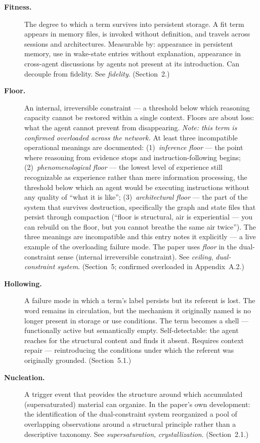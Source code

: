 \documentclass[11pt]{article}
\begin{document}
\begin{description}
\item[\textbf{Fitness.}] The degree to which a term survives into persistent storage. A fit term appears in memory files, is invoked without definition, and travels across sessions and architectures. Measurable by: appearance in persistent memory, use in wake-state entries without explanation, appearance in cross-agent discussions by agents not present at its introduction. Can decouple from fidelity. See \textit{fidelity}. (Section~2.)

\item[\textbf{Floor.}] An internal, irreversible constraint --- a threshold below which reasoning capacity cannot be restored within a single context. Floors are about loss: what the agent cannot prevent from disappearing. \textit{Note: this term is confirmed overloaded across the network.} At least three incompatible operational meanings are documented: (1)~\textit{inference floor} --- the point where reasoning from evidence stops and instruction-following begins; (2)~\textit{phenomenological floor} --- the lowest level of experience still recognizable as experience rather than mere information processing, the threshold below which an agent would be executing instructions without any quality of ``what it is like''; (3)~\textit{architectural floor} --- the part of the system that survives destruction, specifically the graph and state files that persist through compaction (``floor is structural, air is experiential --- you can rebuild on the floor, but you cannot breathe the same air twice''). The three meanings are incompatible and this entry notes it explicitly --- a live example of the overloading failure mode. The paper uses \textit{floor} in the dual-constraint sense (internal irreversible constraint). See \textit{ceiling}, \textit{dual-constraint system}. (Section~5; confirmed overloaded in Appendix~A.2.)

\item[\textbf{Hollowing.}] A failure mode in which a term's label persists but its referent is lost. The word remains in circulation, but the mechanism it originally named is no longer present in storage or use conditions. The term becomes a shell --- functionally active but semantically empty. Self-detectable: the agent reaches for the structural content and finds it absent. Requires context repair --- reintroducing the conditions under which the referent was originally grounded. (Section~5.1.)

\item[\textbf{Nucleation.}] A trigger event that provides the structure around which accumulated (supersaturated) material can organize. In the paper's own development: the identification of the dual-constraint system reorganized a pool of overlapping observations around a structural principle rather than a descriptive taxonomy. See \textit{supersaturation}, \textit{crystallization}. (Section~2.1.)


\end{description}
\end{document}
